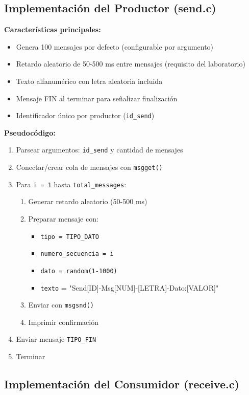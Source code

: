 \documentclass[10pt]{article}
\begin{document}
\subsection{Implementación del Productor (send.c)}

\textbf{Características principales:}
\begin{itemize}
  \item Genera 100 mensajes por defecto (configurable por argumento)
  \item Retardo aleatorio de 50-500 ms entre mensajes (requisito del laboratorio)
  \item Texto alfanumérico con letra aleatoria incluida
  \item Mensaje FIN al terminar para señalizar finalización
  \item Identificador único por productor (\texttt{id\_send})
\end{itemize}

\textbf{Pseudocódigo:}
\begin{enumerate}
  \item Parsear argumentos: \texttt{id\_send} y cantidad de mensajes
  \item Conectar/crear cola de mensajes con \texttt{msgget()}
  \item Para \texttt{i = 1} hasta \texttt{total\_messages}:
  \begin{enumerate}
    \item Generar retardo aleatorio (50-500 ms)
    \item Preparar mensaje con:
    \begin{itemize}
      \item \texttt{tipo = TIPO\_DATO}
      \item \texttt{numero\_secuencia = i}
      \item \texttt{dato = random(1-1000)}
      \item \texttt{texto} = "Send[ID]-Msg[NUM]-[LETRA]-Dato:[VALOR]"
    \end{itemize}
    \item Enviar con \texttt{msgsnd()}
    \item Imprimir confirmación
  \end{enumerate}
  \item Enviar mensaje \texttt{TIPO\_FIN}
  \item Terminar
\end{enumerate}

\subsection{Implementación del Consumidor (receive.c)}
\end{document}
